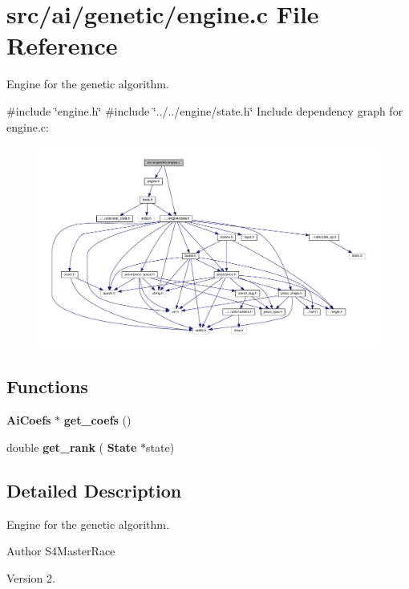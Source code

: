 \section{src/ai/genetic/engine.c File Reference}
\label{engine_8c}


Engine for the genetic algorithm.  


{\ttfamily \#include \char`\"{}engine.\+h\char`\"{}}\newline
{\ttfamily \#include \char`\"{}../../engine/state.\+h\char`\"{}}\newline
Include dependency graph for engine.\+c\+:
\nopagebreak
\begin{figure}[H]
\begin{center}
\leavevmode
\includegraphics[width=350pt]{engine_8c__incl}
\end{center}
\end{figure}
\subsection*{Functions}
\begin{DoxyCompactItemize}
\item 
\textbf{ Ai\+Coefs} $\ast$ \textbf{ get\+\_\+coefs} ()
\item 
double \textbf{ get\+\_\+rank} (\textbf{ State} $\ast$state)
\end{DoxyCompactItemize}


\subsection{Detailed Description}
Engine for the genetic algorithm. 

\begin{DoxyAuthor}{Author}
S4\+Master\+Race 
\end{DoxyAuthor}
\begin{DoxyVersion}{Version}
2. 
\end{DoxyVersion}



